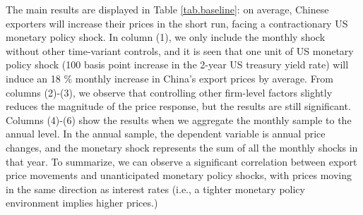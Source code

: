 The main results are displayed in Table \ref{tab.baseline}: on average, Chinese exporters will increase their prices in the short run, facing a contractionary US monetary policy shock. In column (1), we only include the monthly shock without other time-variant controls, and it is seen that one unit of US monetary policy shock (100 basis point increase in the 2-year US treasury yield rate) will induce an 18 $\%$ monthly increase in China's export prices by average. From columns (2)-(3), we observe that controlling other firm-level factors slightly reduces the magnitude of the price response, but the results are still significant. Columns (4)-(6) show the results when we aggregate the monthly sample to the annual level. In the annual sample, the dependent variable is annual price changes, and the monetary shock represents the sum of all the monthly shocks in that year. To summarize, we can observe a significant correlation between export price movements and unanticipated monetary policy shocks, with prices moving in the same direction as interest rates (i.e., a tighter monetary policy environment implies higher prices.)


